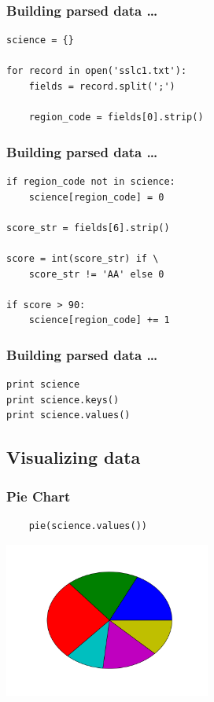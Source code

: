 \documentclass[14pt,compress]{beamer}
\begin{document}
\begin{frame}[fragile]
  \frametitle{Building parsed data \ldots}
  \begin{lstlisting}
science = {}

for record in open('sslc1.txt'):
    fields = record.split(';')

    region_code = fields[0].strip()
  \end{lstlisting}
\end{frame}

\begin{frame}[fragile]
  \frametitle{Building parsed data \ldots}
  \begin{lstlisting}
if region_code not in science:
    science[region_code] = 0

score_str = fields[6].strip()

score = int(score_str) if \
    score_str != 'AA' else 0

if score > 90:
    science[region_code] += 1
  \end{lstlisting}
\end{frame}

\begin{frame}[fragile]
  \frametitle{Building parsed data \ldots}
  \begin{lstlisting}
print science
print science.keys()
print science.values()
  \end{lstlisting}
\end{frame}

\subsection{Visualizing data}
\begin{frame}[fragile]
  \frametitle{Pie Chart}
  \begin{lstlisting}
    pie(science.values())
  \end{lstlisting}
\includegraphics[height=2in, interpolate=true]{data/science_nolabel}
\end{frame}
\end{document}
